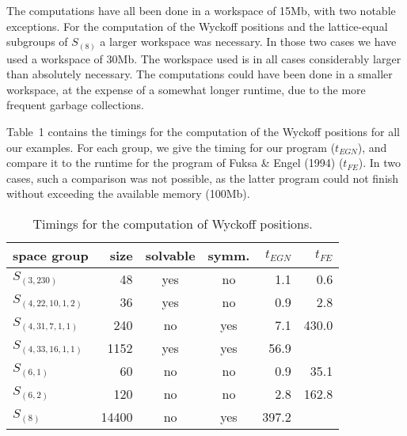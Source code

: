 \documentclass[12pt]{amsart}
\begin{document}
The computations have all been done in a workspace of 15Mb, with two
notable exceptions. For the computation of the Wyckoff positions and
the lattice-equal subgroups of $S_{(8)}$ a larger workspace was
necessary. In those two cases we have used a workspace of 30Mb.
The workspace used is in all cases considerably larger than absolutely
necessary. The computations could have been done in a smaller
workspace, at the expense of a somewhat longer runtime, due to the
more frequent garbage collections.

Table~1 contains the timings for the computation of the Wyckoff 
positions for all our examples. For each group, we give the timing 
for our program ($t_{EGN}$), and compare it to the runtime for the 
program of Fuksa \& Engel (1994) ($t_{FE}$).
In two cases, such a comparison was not possible, as the latter program
could not finish without exceeding the available memory (100Mb).

\begin{table}[h]
\begin{center}
\begin{tabular}{|l||r|c|c|r|r|}
\hline
space group         & size & solvable & symm. & $t_{EGN}$ & $t_{FE}$ \\
\hline
$S_{(3,230)}$       &      48 &  yes  &   no &   1.1   &    0.6     \\
$S_{(4,22,10,1,2)}$ &      36 &  yes  &   no &   0.9   &    2.8     \\
$S_{(4,31, 7,1,1)}$ &     240 &  no   &  yes &   7.1   &  430.0     \\
$S_{(4,33,16,1,1)}$ &    1152 &  yes  &  yes &  56.9   &            \\
$S_{(6,1)}$         &      60 &  no   &   no &   0.9   &   35.1     \\
$S_{(6,2)}$         &     120 &  no   &   no &   2.8   &  162.8     \\
$S_{(8)}$           &   14400 &  no   &  yes & 397.2   &            \\
\hline
\end{tabular}
\end{center}
\bigskip
\caption{Timings for the computation of Wyckoff positions.}
\end{table}
\end{document}
